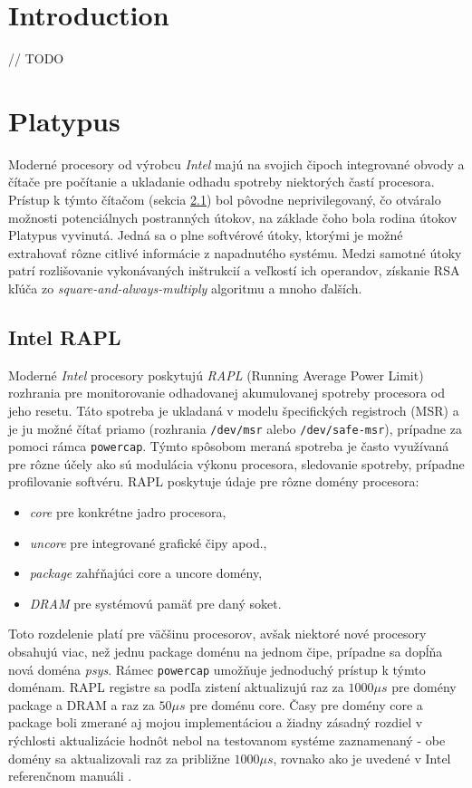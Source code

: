 \newcommand{\code}{\texttt}

\chapter{Introduction}
// TODO

\chapter{Platypus}
Moderné procesory od výrobcu \emph{Intel} majú na svojich čipoch integrované obvody a čítače pre počítanie a ukladanie odhadu spotreby niektorých častí procesora.
Prístup k týmto čítačom (sekcia \ref{sec:rapl}) bol pôvodne neprivilegovaný, čo otváralo možnosti potenciálnych postranných útokov, na základe čoho bola rodina útokov
Platypus vyvinutá. Jedná sa o plne softvérové útoky, ktorými je možné extrahovať rôzne citlivé informácie z napadnutého systému. Medzi samotné útoky
patrí rozlišovanie vykonávaných inštrukcií a veľkostí ich operandov, získanie RSA kľúča zo \emph{square-and-always-multiply} algoritmu a mnoho ďalších.

\section{Intel RAPL} \label{sec:rapl}
Moderné \emph{Intel} procesory poskytujú \emph{RAPL} (Running Average Power Limit) rozhrania pre monitorovanie odhadovanej akumulovanej spotreby procesora
od jeho resetu. Táto spotreba je ukladaná v modelu špecifických registroch (MSR) a je ju možné čítať priamo (rozhrania \code{/dev/msr} alebo \code{/dev/safe-msr}),
prípadne za pomoci rámca \code{powercap}. Týmto spôsobom meraná spotreba je často využívaná pre rôzne účely ako sú modulácia výkonu procesora,
sledovanie spotreby, prípadne profilovanie softvéru.
RAPL poskytuje údaje pre rôzne domény procesora:
\begin{itemize}
    \item \emph{core} pre konkrétne jadro procesora,
    \item \emph{uncore} pre integrované grafické čipy apod.,
    \item \emph{package} zahŕňajúci core a uncore domény,
    \item \emph{DRAM} pre systémovú pamäť pre daný soket.
\end{itemize}
Toto rozdelenie platí pre väčšinu procesorov, avšak niektoré nové procesory obsahujú viac, než jednu package doménu na jednom čipe, prípadne sa dopĺňa
nová doména \emph{psys}. %
Rámec \code{powercap} umožňuje jednoduchý prístup k týmto doménam.
RAPL registre sa podľa zistení \cite{Platypus} aktualizujú raz za $1000 \mu s$ pre domény package a DRAM a raz za $50 \mu s$ pre doménu core.
Časy pre domény core a package boli zmerané aj mojou implementáciou a žiadny zásadný rozdiel v rýchlosti aktualizácie hodnôt
nebol na testovanom systéme zaznamenaný - obe domény sa aktualizovali raz za približne $1000 \mu s$, rovnako ako je uvedené v Intel referenčnom
manuáli \cite{intel_manual}.

